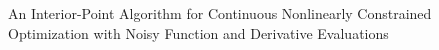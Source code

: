 An Interior-Point Algorithm for Continuous Nonlinearly Constrained Optimization with Noisy Function and Derivative Evaluations